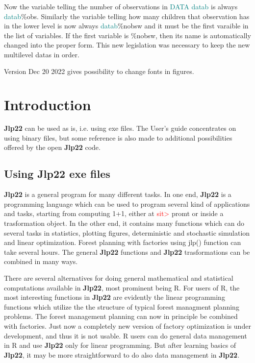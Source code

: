 Now the variable telling the number of observations in \textcolor{teal}{DATA} \textcolor{teal}{datab} is always \textcolor{teal}{datab}\%obs. 
Similarly the variable 
telling how many children that observation has in the lower level 
is now always \textcolor{teal}{datab}\%nobsw and it must be the 
first varaible in the list of variables. If the first variable is \%nobsw, then its name is automatically 
changed into the proper form. This new legislation was necessary to keep the new multilevel 
datas in order. 
 
Version Dec 20 2022 gives possibility to change fonts in figures. 
 
\section{Introduction} 
\label{intro} 
\textbf{Jlp22} can be used as is, i.e. using exe files. The User's guide concentrates 
on using binary files, but some reference is also made to additional possibilities offered 
by the open \textbf{Jlp22} code. 
\subsection{Using \textbf{Jlp22} exe files} 
\label{intro1} 
\textbf{Jlp22} is a general program for many different tasks. In one end, \textbf{Jlp22} is a programming language which 
can be used to program several kind of applications and tasks, starting from computing 1+1, either 
at \textcolor{Red}{sit>} promt or inside a trasformation object. 
In the other end, it contains many functions which 
can do several tasks in statistics, plotting figures, 
deterministic and stochastic simulation and linear optimization. Forest planning with factories 
using \textcolor{VioletRed}{jlp}() function can take several hours. 
The general \textbf{Jlp22} functions and \textbf{Jlp22} trasformations can be combined in many ways. 
 
There are several alternatives for doing general mathematical and statistical 
computations available in \textbf{Jlp22}, most prominent being R. For  users of R, the most interesting 
functions in \textbf{Jlp22} are evidently the linear programming functions which utilize the the structure 
of typical forest managment planning problems. The forest management planning can now 
in principle be combined with factories. Just now a completely new version of factory optimization 
is under development, and thus it is not usable. R users can do general data management in R and use 
\textbf{Jlp22} only for linear programming. But after learning basics of \textbf{Jlp22}, it may be more 
straightforward to do also data management in \textbf{Jlp22}. 
 
